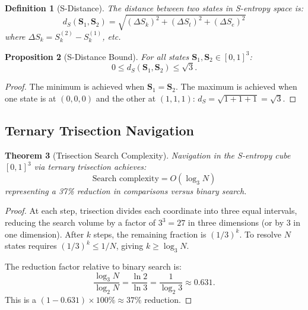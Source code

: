 \documentclass[10pt,twocolumn]{article}
\newtheorem{theorem}{Theorem}[section]
\newtheorem{definition}[theorem]{Definition}
\newtheorem{proposition}[theorem]{Proposition}
\theoremstyle{remark}
\newcommand{\Sk}{S_k}
\newcommand{\St}{S_t}
\newcommand{\Se}{S_e}
\newcommand{\Scoord}{\mathbf{S}}
\newcommand{\dS}{d_S}
\begin{document}
\begin{definition}[S-Distance]
\label{def:sdistance}
The distance between two states in S-entropy space is:
\begin{equation}
\dS(\Scoord_1, \Scoord_2) = \sqrt{(\Delta \Sk)^2 + (\Delta \St)^2 + (\Delta \Se)^2}
\label{eq:sdist}
\end{equation}
where $\Delta \Sk = \Sk^{(2)} - \Sk^{(1)}$, etc.
\end{definition}

\begin{proposition}[S-Distance Bound]
\label{prop:sbound}
For all states $\Scoord_1, \Scoord_2 \in [0,1]^3$:
\begin{equation}
0 \leq \dS(\Scoord_1, \Scoord_2) \leq \sqrt{3}.
\label{eq:sbound}
\end{equation}
\end{proposition}

\begin{proof}
The minimum is achieved when $\Scoord_1 = \Scoord_2$. The maximum is achieved when one state is at $(0,0,0)$ and the other at $(1,1,1)$: $\dS = \sqrt{1+1+1} = \sqrt{3}$.
\end{proof}

\subsection{Ternary Trisection Navigation}

\begin{theorem}[Trisection Search Complexity]
\label{thm:trisection}
Navigation in the S-entropy cube $[0,1]^3$ via ternary trisection achieves:
\begin{equation}
\text{Search complexity} = O(\log_3 N)
\label{eq:trisection}
\end{equation}
representing a 37\% reduction in comparisons versus binary search.
\end{theorem}

\begin{proof}
At each step, trisection divides each coordinate into three equal intervals, reducing the search volume by a factor of $3^3 = 27$ in three dimensions (or by 3 in one dimension). After $k$ steps, the remaining fraction is $(1/3)^k$. To resolve $N$ states requires $(1/3)^k \leq 1/N$, giving $k \geq \log_3 N$.

The reduction factor relative to binary search is:
\begin{equation}
\frac{\log_3 N}{\log_2 N} = \frac{\ln 2}{\ln 3} = \frac{1}{\log_2 3} \approx 0.631.
\end{equation}
This is a $(1 - 0.631) \times 100\% \approx 37\%$ reduction.
\end{proof}
\end{document}
